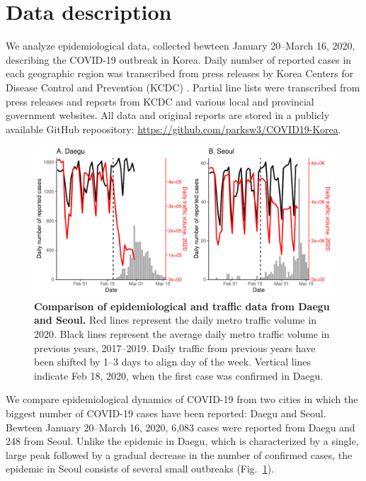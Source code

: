 \documentclass[12pt]{article}
\newcommand{\fref}[1]{Fig.~\ref{fig:#1}}
\begin{document}
\section{Data description}

We analyze epidemiological data, collected bewteen January 20--March 16, 2020, describing the COVID-19 outbreak in Korea.
Daily number of reported cases in each geographic region was transcribed from press releases by Korea Centers for Disease Control and Prevention (KCDC) \cite{kcdc}.
Partial line lists were transcribed from press releases and reports from KCDC and various local and provincial government websites.
All data and original reports are stored in a publicly available GitHub repoository: \url{https://github.com/parksw3/COVID19-Korea}.

\begin{figure}[!h]
\includegraphics[width=\textwidth]{figure_compare_report.pdf}
\caption{
\textbf{Comparison of epidemiological and traffic data from Daegu and Seoul.}
Red lines represent the daily metro traffic volume in 2020.
Black lines represent the average daily metro traffic volume in previous years, 2017--2019.
Daily traffic from previous years have been shifted by 1--3 days to align day of the week.
Vertical lines indicate Feb 18, 2020, when the first case was confirmed in Daegu.
}
\label{fig:data}
\end{figure}

We compare epidemiological dynamics of COVID-19 from two cities in which the biggest number of COVID-19 cases have been reported: Daegu and Seoul.
Bewteen January 20--March 16, 2020, 6,083 cases were reported from Daegu and 248 from Seoul.
Unlike the epidemic in Daegu, which is characterized by a single, large peak followed by a gradual decrease in the number of confirmed cases, the epidemic in Seoul consists of several small outbreaks (\fref{data}).
\end{document}
